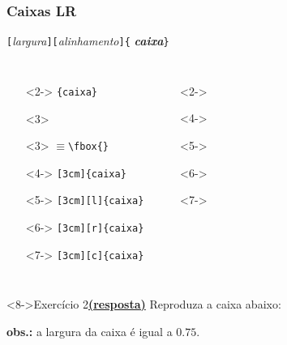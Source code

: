 \documentclass[handout,10pt]{beamer}
\begin{document}
\begin{frame}[fragile]
	\frametitle{Caixas LR}
	
	\begin{block}{}
		\centering
		\verb|[|\textit{largura}\verb|][|\textit{alinhamento}\verb|]{|
		\textit{\textbf{caixa}}\verb|}|
	\end{block}
	
	\vfill
			
	\begin{columns}
		\begin{itemize}
			\item[]<2-> \verb|{caixa}|
					\begin{uncoverenv}<3>
						\begin{alertenv}<3>
							$\equiv$\verb|\fbox{}|
						\end{alertenv}
					\end{uncoverenv}
			\item[]<4-> \verb|[3cm]{caixa}|
			\item[]<5-> \verb|[3cm][l]{caixa}|
			\item[]<6-> \verb|[3cm][r]{caixa}|
			\item[]<7-> \verb|[3cm][c]{caixa}|
		\end{itemize}
		
		\begin{itemize}
			\item[]<2-> 
			\item[]<4-> 
			\item[]<5-> 
			\item[]<6-> 
			\item[]<7-> 
		\end{itemize}		
	\end{columns}
			
	\vfill
	
	\begin{block}<8->{Exercício 2\hyperlink{respostas}{\footnotesize\textbf{(resposta)}}}
		Reproduza a caixa abaixo:
		
		\begin{center}
		\end{center}

		\footnotesize\textbf{obs.:} a largura da caixa é igual a $0.75$.
	\end{block}

\end{frame}
\end{document}
